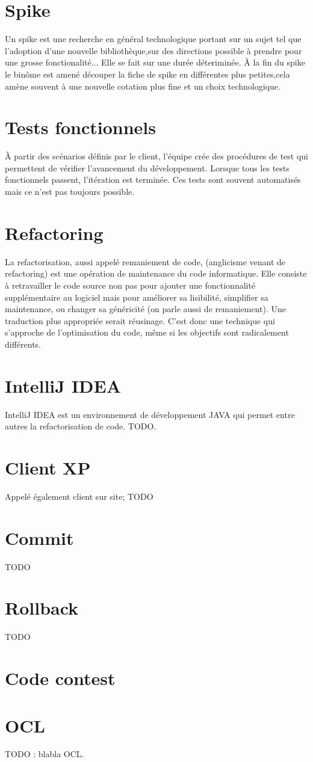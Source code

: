 \section{Spike}\label{lexique:spike}
Un spike est une recherche en général technologique portant sur un sujet tel que l'adoption d'une nouvelle bibliothèque,sur des directions possible à prendre pour une grosse fonctionalité... Elle se fait sur une durée déteriminée. À la fin du spike le binôme est amené découper la fiche de spike en différentes plus petites,cela amène souvent à une nouvelle cotation plus fine et un choix technologique.

\section{Tests fonctionnels}\label{lexique:testsFonctionnels}
À partir des scénarios définis par le client, l'équipe crée des procédures de test qui permettent de vérifier l'avancement du développement. Lorsque tous les tests fonctionnels passent, l'itération est terminée. Ces tests sont souvent automatisés mais ce n'est pas toujours possible.

\section{Refactoring}\label{lexique:refactoring}
La refactorisation, aussi appelé remaniement de code, (anglicisme venant de refactoring) est une opération de maintenance du code informatique. Elle consiste à retravailler le code source non pas pour ajouter une fonctionnalité supplémentaire au logiciel mais pour améliorer sa lisibilité, simplifier sa maintenance, ou changer sa généricité (on parle aussi de remaniement). Une traduction plus appropriée serait réusinage. C'est donc une technique qui s'approche de l'optimisation du code, même si les objectifs sont radicalement différents. 

\section{IntelliJ IDEA}\label{lexique:IDEA}
IntelliJ IDEA est un environnement de développement JAVA qui permet entre autres la refactorisation de code.
TODO.
\section{Client XP}\label{lexique:clientXP}
Appelé également client sur site; TODO

\section{Commit}\label{lexique:commit}
TODO

\section{Rollback}\label{lexique:rollback}
TODO

\section{Code contest}\label{lexique:codeContest}

\section{OCL}\label{lexique:OCL}
TODO : blabla OCL.
